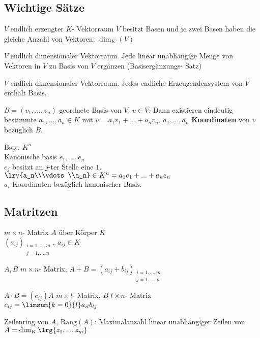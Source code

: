 \subsection{Wichtige Sätze}
		\item $V$ endlich erzeugter $K$- Vektorraum $V$ besitzt Basen und je zwei Basen haben die gleiche Anzahl von Vektoren: $\dim_K(V)$
		\item $V$ endlich dimensionaler Vektorraum. Jede linear unabhängige Menge von Vektoren in $V$ zu Basis von $V$ ergänzen (Basisergänzungs- Satz)
		\item $V$ endlich dimensionaler Vektorraum. Jedes endliche Erzeugendensystem von $V$ enthält Basis.
		\item $B=(v_1,...,v_n)$ geordnete Basis von $V$. $v\in V$. Dann existieren eindeutig bestimmte $a_1,...,a_n\in K$ mit $v=a_1v_1+...+a_nv_n$. $a_1,...,a_n$ \textbf{Koordinaten} von $v$ bezüglich $B$.

		Bsp.: $K^n$\\
		Kanonische basis $e_1,...,e_n$\\
		$e_j$ besitzt an $j$-ter Stelle eine $1$.\\
		$\lrv{a_n\\\vdots\\a_n}\in K^n=a_1e_1+...+a_ne_n$\\
		$a_i$ Koordinaten bezüglich kanonischer Basis.
	\subExEnd

\subsection{Matritzen}
		\item $m\times n$- Matrix $A$ über Körper $K$\\
		$(a_{ij})_{
			\begin{array}{l}
			i=1,...,m\\
			j=1,...,n
			\end{array}
		},\ a_{ij}\in K$
		\item $A,B$ $m\times n$- Matrix, $A+B=(a_{ij}+b_{ij})_{
			\begin{array}{l}
			i=1,...,m\\
			j=1,...,n
			\end{array}
		}$
		\item $A\cdot B=(c_{ij})$\quad $A$ $m\times l$- Matrix, $B$ $l\times n$- Matrix\\
		$c_{ij}=\limsum{k=0}{l}a_{il}b_{lj}$
		\item Zeilenring von $A$, $\mbox{Rang}(A)$: Maximalanzahl linear unabhängiger Zeilen von $A=\dim_K\lrg{z_1,...,z_m}$
	\subExEnd

